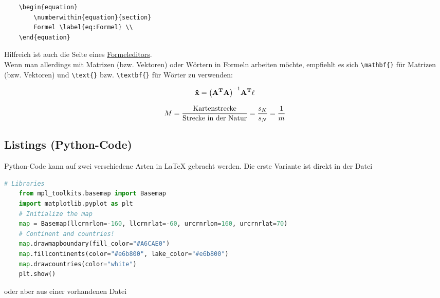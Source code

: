 \begin{verbatim}
    \begin{equation}
        \numberwithin{equation}{section}
        Formel \label{eq:Formel} \\
    \end{equation}
\end{verbatim}

Hilfreich ist auch die Seite eines \href{https://www.codecogs.com/latex/eqneditor.php}{Formeleditors}.\\

Wenn man allerdings mit Matrizen (bzw. Vektoren) oder Wörtern in Formeln arbeiten möchte, empfiehlt es sich \verb|\mathbf{}| für Matrizen (bzw. Vektoren) und \verb|\text{}| bzw. \verb|\textbf{}| für Wörter zu verwenden:

\begin{equation}
	\numberwithin{equation}{section}
	\mathbf{\hat{x}} = \mathbf{\left(A^T A\right)}^{-1} \mathbf{A^T \ell} \label{eq:Ausgleichung} \\
\end{equation}

\begin{equation}
	\numberwithin{equation}{section}
	M = \frac{\text{Kartenstrecke}}{\text{Strecke in der Natur}} = \frac{s_K}{s_N} = \frac{1}{m} \label{eq:Maßstab} \\
\end{equation}


\subsection{Listings (Python-Code)}

Python-Code kann auf zwei verschiedene Arten in \LaTeX{} gebracht werden. Die erste Variante ist direkt in der Datei

\begin{lstlisting}[language=Python, style=Python, caption=Basemap-Anwendung, label={lst:basemap}]
	# Libraries
	from mpl_toolkits.basemap import Basemap
	import matplotlib.pyplot as plt
	# Initialize the map
	map = Basemap(llcrnrlon=-160, llcrnrlat=-60, urcrnrlon=160, urcrnrlat=70)
	# Continent and countries!
	map.drawmapboundary(fill_color="#A6CAE0")
	map.fillcontinents(color="#e6b800", lake_color="#e6b800")
	map.drawcountries(color="white")
	plt.show()
\end{lstlisting} 

oder aber aus einer vorhandenen Datei




